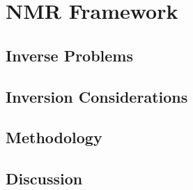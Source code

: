 
\chapter{NMR Framework}
\label{ch:NMR}

\FloatBarrier
\section{Inverse Problems}
\label{sec:inverse}


\FloatBarrier
\section{Inversion Considerations}
\label{sec:consider}


\FloatBarrier
\section{Methodology}
\label{sec:method}


\FloatBarrier
\section{Discussion}
\label{sec:discuss03}